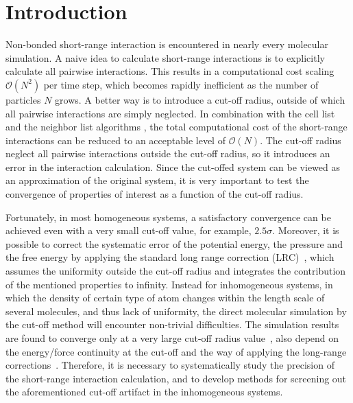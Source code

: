 \documentclass[aps,pre,preprint]{revtex4}
\begin{document}
\section{Introduction}
Non-bonded short-range interaction is encountered in nearly every
molecular simulation.  A naive idea to calculate short-range
interactions is to explicitly calculate all pairwise
interactions. This results in a computational cost scaling $\mathcal
O(N^2)$ per time step, which becomes rapidly inefficient as the number
of particles $N$ grows. A better way is to introduce a cut-off
radius, outside of which all pairwise interactions are simply
neglected. In combination with the cell list and the neighbor list
algorithms \cite{frenkel02b}, the total computational cost of the
short-range interactions can be reduced to an acceptable level of
$\mathcal O(N)$.  The cut-off radius neglect all pairwise interactions
outside the cut-off radius, so it introduces an error in the interaction
calculation. Since the cut-offed system can be viewed as an approximation of
the original system, it is very important to test the
convergence of properties of interest as a function of the cut-off
radius.

Fortunately,
in most homogeneous systems, a satisfactory convergence can be
achieved even with a very small cut-off value, for example,
$2.5\sigma$.  Moreover, it is possible to correct the systematic error
of the potential energy, the pressure and the free energy by applying
the standard long range correction (LRC)~\cite{allen87a}, which
assumes the uniformity outside the cut-off radius and integrates the
contribution of the mentioned properties to infinity. 
Instead for inhomogeneous systems, in which the density of certain type of
atom changes within the length scale of several molecules, 
and thus lack of uniformity, 
the direct molecular simulation 
by the cut-off method will encounter non-trivial
difficulties.
The simulation results are found to converge only at a very large
cut-off radius value~\cite{duque2004some, ismail2007application}, also
depend on the energy/force continuity at the cut-off and the way of
applying the long-range corrections~\cite{trokhymchuk1999computer,
  guo1997long, mecke1997molecular, janecek2006long, goujon2004monte,
  shen2007comparative}.  Therefore, it is necessary to systematically
study the precision of the short-range interaction calculation, and to
develop methods for screening out the aforementioned cut-off artifact in
the inhomogeneous systems.
\end{document}
